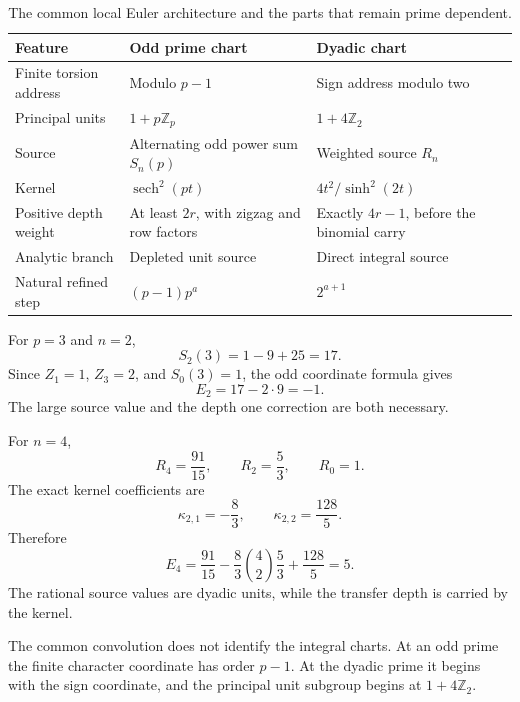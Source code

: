 \begin{table}[t]
\centering
\caption{The common local Euler architecture and the parts that remain prime dependent.}
\label{hist:tab:local_chart_comparison}
\begin{tabular}{>{\raggedright\arraybackslash}p{}>{\raggedright\arraybackslash}p{}>{\raggedright\arraybackslash}p{}}
\toprule
Feature & Odd prime chart & Dyadic chart\\
\midrule
Finite torsion address & Modulo \(p-1\) & Sign address modulo two\\
Principal units & \(1+p\mathbb Z_p\) & \(1+4\mathbb Z_2\)\\
Source & Alternating odd power sum \(S_n(p)\) & Weighted source \(R_n\)\\
Kernel & \(\operatorname{sech}^2(pt)\) & \(4t^2/\sinh^2(2t)\)\\
Positive depth weight & At least \(2r\), with zigzag and row factors & Exactly \(4r-1\), before the binomial carry\\
Analytic branch & Depleted unit source & Direct integral source\\
Natural refined step & \((p-1)p^a\) & \(2^{a+1}\)\\
\bottomrule
\end{tabular}
\end{table}

\begin{histexample}\label{hist:ex:first_odd_reconstruction}
For \(p=3\) and \(n=2\),
\[
S_2(3)=1-9+25=17.
\]
Since \(Z_1=1\), \(Z_3=2\), and \(S_0(3)=1\), the odd coordinate formula gives
\[
E_2
=17-2\cdot9
=-1.
\]
The large source value and the depth one correction are both necessary.
\end{histexample}

\begin{histexample}\label{hist:ex:first_dyadic_reconstruction}
For \(n=4\),
\[
R_4=\frac{91}{15},
\qquad
R_2=\frac53,
\qquad
R_0=1.
\]
The exact kernel coefficients are
\[
\kappa_{2,1}=-\frac83,
\qquad
\kappa_{2,2}=\frac{128}{5}.
\]
Therefore
\[
E_4
=
\frac{91}{15}
-\frac83\binom42\frac53
+\frac{128}{5}
=5.
\]
The rational source values are dyadic units, while the transfer depth is carried by the kernel.
\end{histexample}

\begin{histremark}\label{hist:rem:no_dyadic_substitution}
The common convolution does not identify the integral charts. At an odd prime the finite character coordinate has order \(p-1\). At the dyadic prime it begins with the sign coordinate, and the principal unit subgroup begins at \(1+4\mathbb Z_2\).
\end{histremark}

